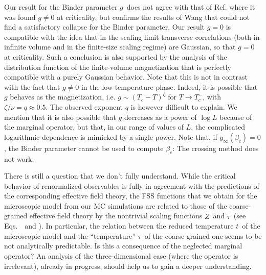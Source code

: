 \documentclass[12pt]{article}
\begin{document}
Our result for the Binder parameter $g$\ does not agree with that
of Ref. \cite{Leung92} where it was found
$g\not=0$ at criticality, but confirms the 
results of Wang \cite{Wang96} that could not find a satisfactory
collapse for the Binder parameter. Our result $g=0$ is compatible
with the idea that in the scaling limit transverse correlations
(both in infinite volume and in the finite-size scaling regime)
are Gaussian, so that $g=0$ at criticality. Such a conclusion is also
supported by the analysis of the distribution function of the finite-volume
magnetization that is perfectly compatible with a purely
Gaussian behavior.
Note that this is
not in contrast with the fact that $g\not=0$ in the low-temperature
phase. Indeed, it is possible that $g$ behaves as the magnetization,
i.e. $g \sim (T_c - T)^{\zeta}$ for $T\to T_c^-$, 
with $\zeta/\nu = q \approx 0.5$.
The observed exponent $q$ is however difficult to explain. 
We mention that it is
also possible that $g$ decreases as a power of $\log L$ because of the
marginal operator, but that, in our range of values of $L$,
the complicated logarithmic dependence is mimicked by a single power.      
Note that, if $g_\infty(\beta_c) = 0$, the Binder parameter 
cannot be used to compute $\beta_c$: The crossing method does not work.

There is still a question that we don't fully understand. 
While the critical behavior of renormalized observables is fully 
in agreement with the predictions of the corresponding effective 
field theory, the FSS functions that we obtain for the microscopic 
model from our MC simulations are related to those 
of the coarse-grained effective field theory by the nontrivial 
scaling functions $\tilde Z$\ and $\tilde\tau$\ 
(see Eqs.~\ and ). 
In particular, the relation between the reduced temperature $t$\ 
of the microscopic model and the ``temperature'' $\tau$\ 
of the coarse-grained one seems to be not analytically predictable. 
Is this a consequence of the neglected marginal operator? 
An analysis of the three-dimensional case (where the operator is irrelevant), 
already in progress, should help us to gain a deeper understanding.

 
%
%
%
%
\end{document}
